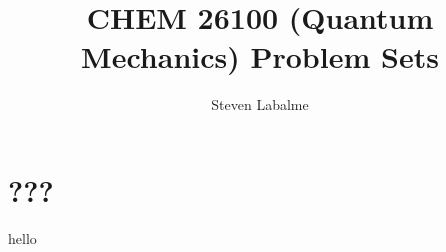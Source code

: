 \documentclass[titlepage]{article}
\title{CHEM 26100 (Quantum Mechanics) Problem Sets}
\author{Steven Labalme}
\begin{document}
\maketitle



\tableofcontents
\newpage



\pagestyle{main}
\renewcommand{\leftmark}{Problem Set \thesection}
\section{???}
hello
\end{document}
